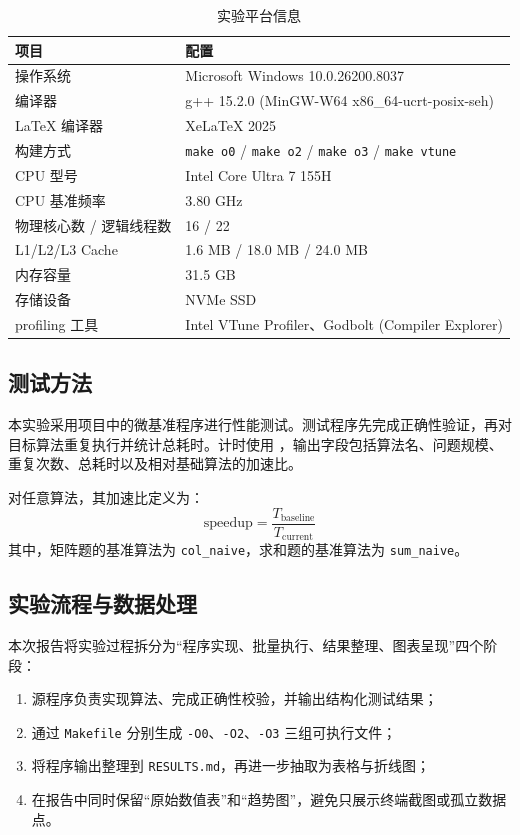 \documentclass[a4paper]{article}
\begin{document}
\begin{table}[H]
  \centering
  \begin{tabular}{ll}
  \toprule
  项目 & 配置 \\
  \midrule
  操作系统 & Microsoft Windows 10.0.26200.8037 \\
  编译器 & g++ 15.2.0 (MinGW-W64 x86\_64-ucrt-posix-seh) \\
  \LaTeX{} 编译器 & XeLaTeX 2025 \\
  构建方式 & \texttt{make o0} / \texttt{make o2} / \texttt{make o3} / \texttt{make vtune} \\
  CPU 型号 & Intel Core Ultra 7 155H \\
  CPU 基准频率 & 3.80 GHz \\
  物理核心数 / 逻辑线程数 & 16 / 22 \\
  L1/L2/L3 Cache & 1.6 MB / 18.0 MB / 24.0 MB \\
  内存容量 & 31.5 GB \\
  存储设备 & NVMe SSD \\
  profiling 工具 & Intel VTune Profiler、Godbolt (Compiler Explorer) \\
  \bottomrule
  \end{tabular}
  \caption{实验平台信息}
  \label{tab:env}
\end{table}

\subsection{测试方法}
本实验采用项目中的微基准程序进行性能测试。测试程序先完成正确性验证，再对目标算法重复执行并统计总耗时。计时使用 ，输出字段包括算法名、问题规模、重复次数、总耗时以及相对基础算法的加速比。

对任意算法，其加速比定义为：
\begin{equation}
 \text{speedup} = \frac{T_{\text{baseline}}}{T_{\text{current}}}
\end{equation}
其中，矩阵题的基准算法为 \texttt{col\_naive}，求和题的基准算法为 \texttt{sum\_naive}。

\subsection{实验流程与数据处理}
本次报告将实验过程拆分为“程序实现、批量执行、结果整理、图表呈现”四个阶段：
\begin{enumerate}
  \item 源程序负责实现算法、完成正确性校验，并输出结构化测试结果；
  \item 通过 \texttt{Makefile} 分别生成 \texttt{-O0}、\texttt{-O2}、\texttt{-O3} 三组可执行文件；
  \item 将程序输出整理到 \texttt{RESULTS.md}，再进一步抽取为表格与折线图；
  \item 在报告中同时保留“原始数值表”和“趋势图”，避免只展示终端截图或孤立数据点。
\end{enumerate}
\end{document}
